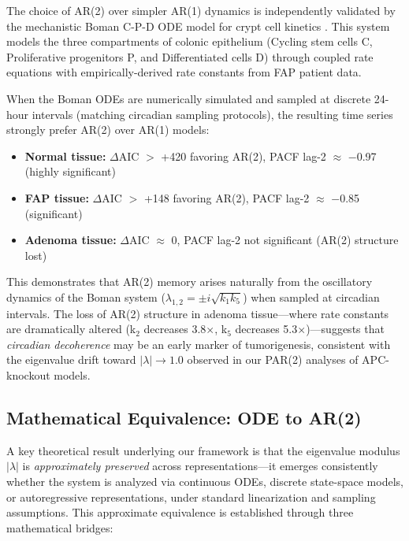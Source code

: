 \documentclass[11pt,a4paper]{article}
\begin{document}
The choice of AR(2) over simpler AR(1) dynamics is independently validated by the mechanistic Boman C-P-D ODE model for crypt cell kinetics \citep{boman2026cancers}. This system models the three compartments of colonic epithelium (Cycling stem cells C, Proliferative progenitors P, and Differentiated cells D) through coupled rate equations with empirically-derived rate constants from FAP patient data.

When the Boman ODEs are numerically simulated and sampled at discrete 24-hour intervals (matching circadian sampling protocols), the resulting time series strongly prefer AR(2) over AR(1) models:

\begin{itemize}
    \item \textbf{Normal tissue:} $\Delta$AIC $>$ +420 favoring AR(2), PACF lag-2 $\approx$ $-$0.97 (highly significant)
    \item \textbf{FAP tissue:} $\Delta$AIC $>$ +148 favoring AR(2), PACF lag-2 $\approx$ $-$0.85 (significant)
    \item \textbf{Adenoma tissue:} $\Delta$AIC $\approx$ 0, PACF lag-2 not significant (AR(2) structure lost)
\end{itemize}

This demonstrates that AR(2) memory arises naturally from the oscillatory dynamics of the Boman system ($\lambda_{1,2} = \pm i\sqrt{k_1 k_5}$) when sampled at circadian intervals. The loss of AR(2) structure in adenoma tissue---where rate constants are dramatically altered (k$_2$ decreases 3.8$\times$, k$_5$ decreases 5.3$\times$)---suggests that \textit{circadian decoherence} may be an early marker of tumorigenesis, consistent with the eigenvalue drift toward $|\lambda| \to 1.0$ observed in our PAR(2) analyses of APC-knockout models.

\subsection{Mathematical Equivalence: ODE to AR(2)}

A key theoretical result underlying our framework is that the eigenvalue modulus $|\lambda|$ is \textit{approximately preserved} across representations---it emerges consistently whether the system is analyzed via continuous ODEs, discrete state-space models, or autoregressive representations, under standard linearization and sampling assumptions. This approximate equivalence is established through three mathematical bridges:
\end{document}
